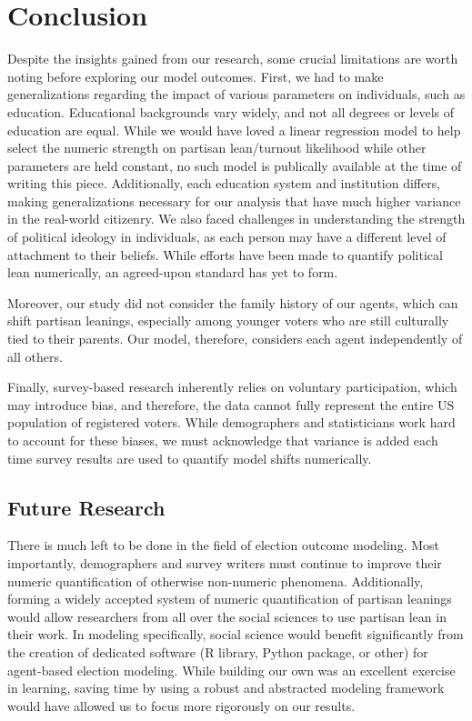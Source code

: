 \documentclass[titlepage, 12pt, leqno]{article} %
\begin{document}
\section{Conclusion}
Despite the insights gained from our research, some crucial limitations are
worth noting before exploring our model outcomes. First, we had to make
generalizations regarding the impact of various parameters on individuals, such
as education. Educational backgrounds vary widely, and not all degrees or 
levels of education are equal. While we would have loved a linear regression
model to help select the numeric strength on partisan lean/turnout likelihood
while other parameters are held constant, no such model is publically available
at the time of writing this piece. Additionally, each education system and
institution differs, making generalizations necessary for our analysis that have
much higher variance in the real-world citizenry. We also faced challenges in
understanding the strength of political ideology in individuals, as each person
may have a different level of attachment to their beliefs. While efforts have
been made to quantify political lean numerically, an agreed-upon standard has 
yet to form. 

Moreover, our study did not consider the family history of our agents, which can
shift partisan leanings, especially among younger voters who are still 
culturally tied to their parents. Our model, therefore, considers each agent
independently of all others. 

Finally, survey-based research inherently relies on voluntary participation,
which may introduce bias, and therefore, the data cannot fully represent the
entire US population of registered voters. While demographers and statisticians
work hard to account for these biases, we must acknowledge that variance is
added each time survey results are used to quantify model shifts numerically. 

\subsection{Future Research}
There is much left to be done in the field of election outcome modeling. Most
importantly, demographers and survey writers must continue to improve their
numeric quantification of otherwise non-numeric phenomena. Additionally, forming
a widely accepted system of numeric quantification of partisan leanings would
allow researchers from all over the social sciences to use partisan lean in 
their work. In modeling specifically, social science would benefit significantly
from the creation of dedicated software (R library, Python package, or other) 
for agent-based election modeling. While building our own was an excellent
exercise in learning, saving time by using a robust and abstracted modeling
framework would have allowed us to focus more rigorously on our results.
\end{document}
